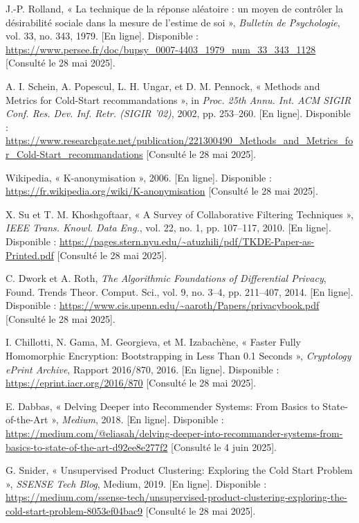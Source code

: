 \documentclass{article}
\begin{document}
\newpage
\begin{thebibliography}{99}

    J.-P. Rolland, « La technique de la réponse aléatoire : un moyen de contrôler la désirabilité sociale dans la mesure de l'estime de soi », \emph{Bulletin de Psychologie}, vol. 33, no. 343, 1979. [En ligne]. Disponible : \url{https://www.persee.fr/doc/bupsy_0007-4403_1979_num_33_343_1128} [Consulté le 28 mai 2025].

    A. I. Schein, A. Popescul, L. H. Ungar, et D. M. Pennock, « Methods and Metrics for Cold-Start recommandations », in \emph{Proc. 25th Annu. Int. ACM SIGIR Conf. Res. Dev. Inf. Retr. (SIGIR '02)}, 2002, pp. 253–260. [En ligne]. Disponible : \url{https://www.researchgate.net/publication/221300490_Methods_and_Metrics_for_Cold-Start_recommandations} [Consulté le 28 mai 2025].

    Wikipedia, « K-anonymisation », 2006. [En ligne]. Disponible : \url{https://fr.wikipedia.org/wiki/K-anonymisation} [Consulté le 28 mai 2025].

    X. Su et T. M. Khoshgoftaar, « A Survey of Collaborative Filtering Techniques », \emph{IEEE Trans. Knowl. Data Eng.}, vol. 22, no. 1, pp. 107–117, 2010. [En ligne]. Disponible : \url{https://pages.stern.nyu.edu/~atuzhili/pdf/TKDE-Paper-as-Printed.pdf} [Consulté le 28 mai 2025].

    C. Dwork et A. Roth, \emph{The Algorithmic Foundations of Differential Privacy}, Found. Trends Theor. Comput. Sci., vol. 9, no. 3–4, pp. 211–407, 2014. [En ligne]. Disponible : \url{https://www.cis.upenn.edu/~aaroth/Papers/privacybook.pdf} [Consulté le 28 mai 2025].

    I. Chillotti, N. Gama, M. Georgieva, et M. Izabachène, « Faster Fully Homomorphic Encryption: Bootstrapping in Less Than 0.1 Seconds », \emph{Cryptology ePrint Archive}, Rapport 2016/870, 2016. [En ligne]. Disponible : \url{https://eprint.iacr.org/2016/870} [Consulté le 28 mai 2025].

    E. Dabbas, « Delving Deeper into Recommender Systems: From Basics to State-of-the-Art », \emph{Medium}, 2018. [En ligne]. Disponible : \url{https://medium.com/@eliasah/delving-deeper-into-recommander-systems-from-basics-to-state-of-the-art-d92ee8e277f2} [Consulté le 4 juin 2025].

    G. Snider, « Unsupervised Product Clustering: Exploring the Cold Start Problem », \emph{SSENSE Tech Blog}, Medium, 2019. [En ligne]. Disponible : \url{https://medium.com/ssense-tech/unsupervised-product-clustering-exploring-the-cold-start-problem-8053ef04bac9} [Consulté le 28 mai 2025].


\end{thebibliography}
\end{document}
